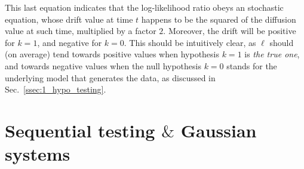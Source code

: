 This last equation indicates that the log-likelihood ratio obeys an stochastic equation, whose drift value at time $t$ happens to be the squared of the diffusion value at such time, multiplied by a factor $2$. Moreover, the drift will be positive for $k=1$, and negative for $k=0$. This should be intuitively clear, as $\ell$ should (on average) tend towards positive values when hypothesis $k=1$ is \textit{the true one}, and towards negative values when the null hypothesis $k=0$ stands for the underlying model that generates the data, as discussed in Sec.~\ref{ssec:1_hypo_testing}.


\section{Sequential testing $\&$ Gaussian systems}


